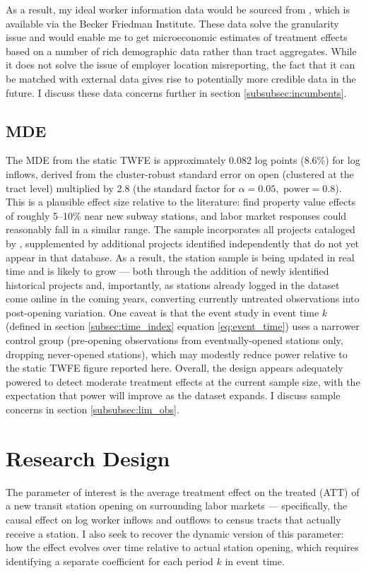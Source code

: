 \documentclass[12pt]{article}
\begin{document}
As a result, my ideal worker information data would be sourced from \textcite{infogroup_residential}, which is available via the Becker Friedman Institute. These data solve the granularity issue and would enable me to get microeconomic estimates of treatment effects based on a number of rich demographic data rather than tract aggregates. While it does not solve the issue of employer location misreporting, the fact that it can be matched with external data gives rise to potentially more credible data in the future. I discuss these data concerns further in section \ref{subsubsec:incumbents}.

\subsection{MDE}
The MDE from the static TWFE is approximately 0.082 log points (8.6\%) for log inflows, derived from the cluster-robust standard error on open (clustered at the tract level) multiplied by 2.8 (the standard factor for $\alpha = 0.05, \text{ power} = 0.8$). This is a plausible effect size relative to the literature: \textcite{Gupta} find property value effects of roughly 5–10\% near new subway stations, and labor market responses could reasonably fall in a similar range. The sample incorporates all projects cataloged by  \textcite{levy_2025_9wnjp-kez15}, supplemented by additional projects identified independently that do not yet appear in that database. As a result, the station sample is being updated in real time and is likely to grow — both through the addition of newly identified historical projects and, importantly, as stations already logged in the dataset come online in the coming years, converting currently untreated observations into post-opening variation. One caveat is that the event study in event time $k$ (defined in section \ref{subsec:time_index} equation \ref{eq:event_time}) uses a narrower control group (pre-opening observations from eventually-opened stations only, dropping never-opened stations), which may modestly reduce power relative to the static TWFE figure reported here. Overall, the design appears adequately powered to detect moderate treatment effects at the current sample size, with the expectation that power will improve as the dataset expands. I discuss sample concerns in section \ref{subsubsec:lim_obs}.

\section{Research Design}\label{sec:design}
The parameter of interest is the average treatment effect on the treated (ATT) of a new transit station opening on surrounding labor markets --- specifically, the causal effect on log worker inflows and outflows to census tracts that actually receive a station. I also seek to recover the dynamic version of this parameter: how the effect evolves over time relative to actual station opening, which requires identifying a separate coefficient for each period $k$ in event time.
\end{document}
